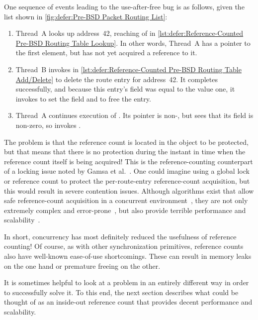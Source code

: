 One sequence of events leading to the use-after-free bug is as follows,
given the list shown in
\cref{fig:defer:Pre-BSD Packet Routing List}:

\begin{fcvref}
\begin{enumerate}
\item	Thread~A looks up address~42, reaching
	 of
	 in
	\cref{lst:defer:Reference-Counted Pre-BSD Routing Table Lookup}.
	In other words, Thread~A has a pointer to the first element,
	but has not yet acquired a reference to it.
\item	Thread~B invokes  in
	\cref{lst:defer:Reference-Counted Pre-BSD Routing Table Add/Delete}
	to delete the route entry for address~42.
	It completes successfully, and because this entry's 
	field was equal to the value one, it invokes
	 to set the  field and to free the entry.
\item	Thread~A continues execution of .
	Its  pointer is non-, but
	 sees that
	its  field is non-zero,
	so  invokes
	.
\end{enumerate}
\end{fcvref}

The problem is that the reference count is located in the object
to be protected, but that means that there is no protection during
the instant in time when the reference count itself is being acquired!
This is the reference-counting counterpart of a locking issue noted
by Gamsa et al.~\cite{Gamsa99}.
One could imagine using a global lock or reference count to protect
the per-route-entry reference-count acquisition, but this would
result in severe contention issues.
Although algorithms exist that allow safe reference-count acquisition
in a concurrent environment~\cite{Valois95a}, they are not only extremely
complex and error-prone~\cite{MagedMichael95a}, but also provide
terrible performance and scalability~\cite{ThomasEHart2007a}.

In short, concurrency has most definitely reduced the usefulness
of reference counting!
Of course, as with other synchronization primitives, reference counts
also have well-known ease-of-use shortcomings.
These can result in memory leaks on the one hand or premature
freeing on the other.

\QuickQuizEnd

It is sometimes helpful to look at a problem in an entirely different
way in order to successfully solve it.
To this end, the next section describes what could be thought of as
an inside-out reference count that provides decent performance and
scalability.
